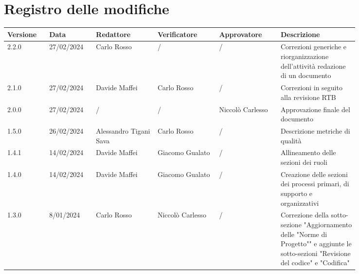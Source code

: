\section*{Registro delle modifiche}
 {
  \scriptsize
  \begin{tabular}{p{0.10\linewidth}p{0.10\linewidth}p{0.15\linewidth}p{0.15\linewidth}p{0.15\linewidth}p{0.19\linewidth}}
	  \textbf{Versione} & \textbf{Data} & \textbf{Redattore}     & \textbf{Verificatore} & \textbf{Approvatore} & \textbf{Descrizione}                                                                                                                     \\
	  \toprule
	  2.2.0             & 27/02/2024    & Carlo Rosso            & /                     & /                    & Correzioni generiche e riorganizzazione dell'attività redazione di un documento                                                          \\
	  \hline
	  2.1.0             & 27/02/2024    & Davide Maffei          & Carlo Rosso           & /                    & Correzioni in seguito alla revisione RTB                                                                                                 \\
	  \hline
	  2.0.0             & 27/02/2024    & /                      & /                     & Niccolò Carlesso     & Approvazione finale del documento                                                                                                        \\
	  \hline
	  1.5.0             & 26/02/2024    & Alessandro Tigani Sava & Carlo Rosso           & /                    & Descrizione metriche di qualità                                                                                                          \\
	  \hline
	  1.4.1             & 14/02/2024    & Davide Maffei          & Giacomo Gualato       & /                    & Allineamento delle sezioni dei ruoli                                                                                                     \\
	  \hline
	  1.4.0             & 14/02/2024    & Davide Maffei          & Giacomo Gualato       & /                    & Creazione delle sezioni dei processi primari, di supporto e organizzativi                                                                \\
	  \hline
	  1.3.0             & 8/01/2024     & Carlo Rosso            & Niccolò Carlesso      & /                    & Correzione della sotto-sezione "Aggiornamento delle "Norme di Progetto"" e aggiunte le sotto-sezioni "Revisione del codice" e "Codifica" \\

\end{tabular}}
